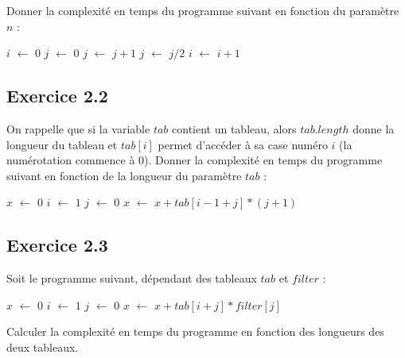 \documentclass{article}[12pt]
\newcommand*\Let[2]{\State #1 $\gets$ #2}
\begin{document}
Donner la complexité en temps du programme suivant en fonction du paramètre $n$ :

\begin{tcolorbox}
  \begin{algorithmic}[1]
    \Statex
      \Let{$i$}{$0$}
      \Let{$j$}{$0$}
          \Let{$j$}{$j + 1$}
         \Else
          \Let{$j$}{$j / 2$}
        \EndIf
      \Let{$i$}{$i + 1$} 
      \EndWhile
  \end{algorithmic}
\end{tcolorbox}


\subsection*{Exercice 2.2}

On rappelle que si la variable $tab$ contient un tableau, alors $tab.length$ donne la longueur du tableau et $tab[i]$ permet d'accéder à sa case numéro $i$ (la numérotation commence à 0). Donner la complexité en temps du programme suivant en fonction de la longueur du paramètre $tab$ :

\begin{tcolorbox}
  \begin{algorithmic}[1]
    \Statex
      \Let{$x$}{$0$}
      \Let{$i$}{$1$}
      \Let{$j$}{$0$}
          \Let{$x$}{$x + tab[i - 1 + j] * ( j + 1 )$}
          \EndFor
      \EndFor
  \end{algorithmic}
\end{tcolorbox}


\subsection*{Exercice 2.3}
Soit le programme suivant, dépendant des tableaux $tab$ et $filter$ :
\begin{tcolorbox}
  \begin{algorithmic}[1]
    \Statex
      \Let{$x$}{$0$}
      \Let{$i$}{$1$}
      \Let{$j$}{$0$}
          \Let{$x$}{$x + tab[i + j] * filter[j]$}
          \EndFor
      \EndFor
  \end{algorithmic}
\end{tcolorbox}

Calculer la complexité en temps du programme en fonction des longueurs des deux tableaux.
\end{document}
